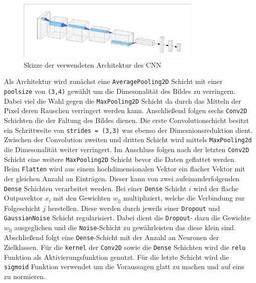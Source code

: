 \begin{figure}[h]
		\centering
		\includegraphics[width=0.8\textwidth]{pictures/architecture.pdf}
		\caption{Skizze der verwendeten Architektur des CNN \cite{nnsvg}}
		\label{fig:}
\end{figure}
Als Architektur wird zunächst eine \texttt{AveragePooling2D} Schicht mit einer
\texttt{poolsize} von \texttt{(3,4)} gewählt um die Dimesonalität des Bildes zu verringern.
Dabei viel die Wahl gegen die \texttt{MaxPooling2D} Schicht da durch das 
Mitteln der Pixel deren Rauschen verringert werden kann.
Anschließend folgen sechs \texttt{Conv2D} Schichten die der Faltung des Bildes
dienen. 
Die erste Convolutionschicht besitzt ein Schrittweite von \texttt{strides =
(3,3)} was ebenso der Dimesnionsreduktion dient.
Zwischen der Convolution zweiten und dritten Schicht wird mittels
\texttt{MaxPooling2d} die Dimesonalität weiter verringert. 
Im Anschluss folgen nach der letzten \texttt{Conv2D} Schicht eine weitere
\texttt{MaxPooling2D} Schicht bevor die Daten geflattet werden.
Beim \texttt{Flatten} wird aus einem hochdimensionalen Vektor ein flacher Vektor
mit der gleichen Anzahl an Einträgen.
Dieser kann von zwei aufeinanderfolgenden \texttt{Dense} Schichten verarbeitet
werden.
Bei einer \texttt{Dense} Schicht $i$ wird der flache Outpuvektor $x_i$ mit den
Gewichten $w_\text{ij}$ multipliziert, welche die Verbindung zur Folgeschicht
$j$ herstellen.
Diese werden durch jeweils einer \texttt{Dropout} und \texttt{GaussianNoise} 
Schicht regularisiert. 
Dabei dient die \texttt{Dropout}- dazu die Gewichte $w_\text{ij}$ ausgeglichen 
und die \texttt{Noise}-Schicht zu gewährleisten das diese klein sind.
Abschließend folgt eine \texttt{Dense}-Schicht mit der Anzahl an Neuronen der
Zielklassen.
Für die \texttt{kernel} der \texttt{Conv2D} sowie die \texttt{Dense}
Schichten wird die \texttt{relu} Funktion als Aktivierungsfunktion
genutzt.
Für die letzte Schicht wird die \texttt{sigmoid} Funktion verwendet um die
Voraussagen glatt zu machen und auf eins zu normieren.
